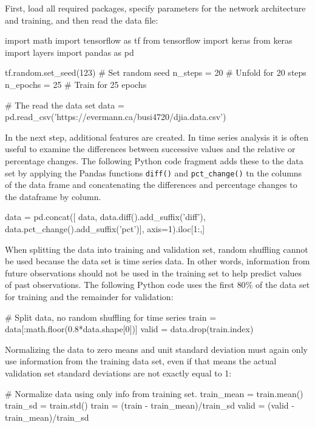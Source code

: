 \begin{withcode}
First, load all required packages, specify parameters for the network architecture and training, and then read the data file:

\begin{pythoncode}
import math
import tensorflow as tf
from tensorflow import keras
from keras import layers
import pandas as pd

tf.random.set_seed(123)   # Set random seed
n_steps = 20              # Unfold for 20 steps
n_epochs = 25             # Train for 25 epochs

# The read the data set
data = pd.read_csv('https://evermann.ca/busi4720/djia.data.csv')
\end{pythoncode}

In the next step, additional features are created. In time series analysis it is often useful to examine the differences between successive values and the relative or percentage changes. The following Python code fragment adds these to the data set by applying the Pandas functions \texttt{diff()} and \texttt{pct\_change()} tn the columns of the data frame and concatenating the differences and percentage changes to the dataframe by column.

\begin{pythoncode}
data = pd.concat([
    data,
    data.diff().add_suffix('diff'),
    data.pct_change().add_suffix('pct')],
    axis=1).iloc[1:,]
\end{pythoncode}

When splitting the data into training and validation set, random shuffling cannot be used because the data set is time series data. In other words, information from future observations should not be used in the training set to help predict values of past observations. The following Python code uses the first $80\%$ of the data set for training and the remainder for validation:

\begin{pythoncode}    
# Split data, no random shuffling for time series
train = data[:math.floor(0.8*data.shape[0])]
valid = data.drop(train.index)
\end{pythoncode}

Normalizing the data to zero means and unit standard deviation must again only use information from the training data set, even if that means the actual validation set standard deviations are not exactly equal to 1:

\begin{pythoncode}
# Normalize data using only info from training set.
train_mean = train.mean()
train_sd = train.std()
train = (train - train_mean)/train_sd
valid = (valid - train_mean)/train_sd
\end{pythoncode}


\end{withcode}
